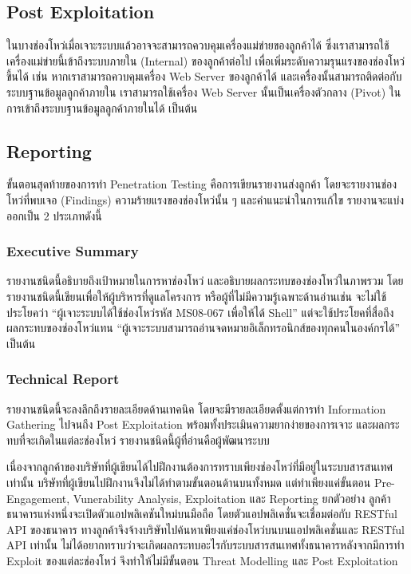 \subsection{Post Exploitation}

ในบางช่องโหว่เมื่อเจาะระบบแล้วอาจจะสามารถควบคุมเครื่องแม่ข่ายของลูกค้าได้ ซึ่งเราสามารถใช้เครื่องแม่ข่ายนี้เข้าถึงระบบภายใน (Internal)\cite{???}  ของลูกค้าต่อไป เพื่อเพิ่มระดับความรุนแรงของช่องโหว่ขึ้นได้ เช่น หากเราสามารถควบคุมเครื่อง Web Server ของลูกค้าได้ และเครื่องนั้นสามารถติดต่อกับระบบฐานข้อมูลลูกค้าภายใน เราสามารถใช้เครื่อง Web Server นั้นเป็นเครื่องตัวกลาง (Pivot)\cite{???} ในการเข้าถึงระบบฐานข้อมูลลูกค้าภายในได้ เป็นต้น

\subsection{Reporting}

ขั้นตอนสุดท้ายของการทำ Penetration Testing คือการเขียนรายงานส่งลูกค้า โดยจะรายงานช่องโหว่ที่พบเจอ (Findings) ความร้ายแรงของช่องโหว่นั้น ๆ และคำแนะนำในการแก้ไข
รายงานจะแบ่งออกเป็น 2 ประเภทดังนี้

\subsubsection{Executive Summary}

รายงานชนิดนี้อธิบายถึงเป้าหมายในการหาช่องโหว่ และอธิบายผลกระทบของช่องโหว่ในภาพรวม โดยรายงานชนิดนี้เขียนเพื่อให้ผู้บริหารที่ดูแลโครงการ หรือผู้ที่ไม่มีความรู้เฉพาะด้านอ่านเช่น จะไม่ใช้ประโยคว่า “ผู้เจาะระบบได้ใช้ช่องโหว่รหัส MS08-067 เพื่อให้ได้ Shell” แต่จะใช้ประโยคที่สื่อถึงผลกระทบของช่องโหว่แทน “ผู้เจาะระบบสามารถอ่านจดหมายอิเล็กทรอนิกส์ของทุกคนในองค์กรได้” เป็นต้น

\subsubsection{Technical Report}

รายงานชนิดนี้จะลงลึกถึงรายละเอียดด้านเทคนิค โดยจะมีรายละเอียดตั้งแต่การทำ Information Gathering ไปจนถึง Post Exploitation พร้อมทั้งประเมินความยากง่ายของการเจาะ และผลกระทบที่จะเกิดในแต่ละช่องโหว่ รายงานชนิดนี้ผู้ที่อ่านคือผู้พัฒนาระบบ


เนื่องจากลูกค้าของบริษัทที่ผู้เขียนได้ไปฝึกงานต้องการทราบเพียงช่องโหว่ที่มีอยู่ในระบบสารสนเทศเท่านั้น บริษัทที่ผู้เขียนไปฝึกงานจึงไม่ได้ทำตามขั้นตอนด้านบนทั้งหมด  แต่ทำเพียงแค่ขั้นตอน Pre-Engagement, Vunerability Analysis, Exploitation และ Reporting  ยกตัวอย่าง ลูกค้าธนาคารแห่งหนึ่งจะเปิดตัวแอปพลิเคชันใหม่บนมือถือ โดยตัวแอปพลิเคชั่นจะเชื่อมต่อกับ RESTful API ของธนาคาร ทางลูกค้าจึงจ้างบริษัทไปค้นหาเพียงแค่ช่องโหว่บนบนแอปพลิเคชั่นและ RESTful API เท่านั้น ไม่ได้อยากทราบว่าจะเกิดผลกระทบอะไรกับระบบสารสนเทศทั้งธนาคารหลังจากมีการทำ Exploit ของแต่ละช่องโหว่ จึงทำให้ไม่มีขั้นตอน Threat Modelling และ Post Exploitation

